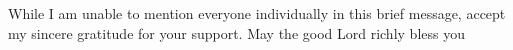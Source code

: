 
\begin{acknowledgements}      


While I am unable to mention everyone individually in this brief message, accept my sincere gratitude for your support. May the good Lord richly bless you


\end{acknowledgements}
